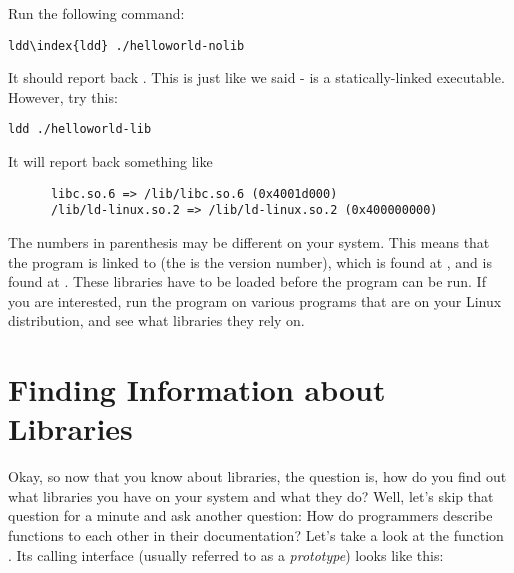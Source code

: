 Run the following command:

\begin{simpletyping}
\begin{lstlisting}
ldd\index{ldd} ./helloworld-nolib
\end{lstlisting}
\end{simpletyping}

It should report back .  
This is just like we said -  is a 
statically-linked executable.  However, try this:

\begin{simpletyping}
\begin{lstlisting}
ldd ./helloworld-lib
\end{lstlisting}
\end{simpletyping}

It will report back something like

\begin{simpletyping}
\begin{lstlisting}
      libc.so.6 => /lib/libc.so.6 (0x4001d000)
      /lib/ld-linux.so.2 => /lib/ld-linux.so.2 (0x400000000)
\end{lstlisting}
\end{simpletyping}

The numbers in parenthesis may be different on your system.  This
means that the program  is 
linked to  (the  
is the version number), which is found at ,
and  is found at 
.  These libraries have to be loaded
before the program can be run.  If you are interested, run the 
program on various programs that are on your Linux distribution, and see what
libraries they rely on.

\section{Finding Information about Libraries}

Okay, so now that you know about libraries, the question is, how
do you find out what libraries you have on your system and what
they do?  Well, let's skip that question for a minute and ask another
question: How do programmers describe functions to each other in their 
documentation?  Let's
take a look at the function .  Its calling interface
(usually referred to as a \emph{prototype}) looks like this:

